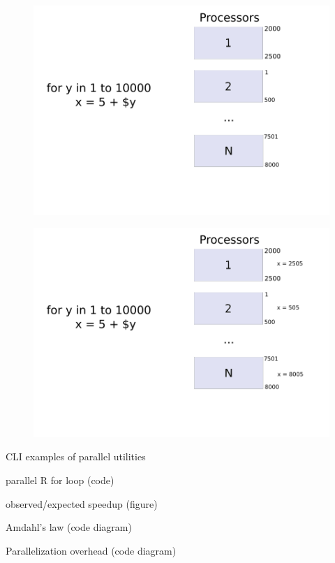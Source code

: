 
\begin{frame}
		\begin{figure}
				\includegraphics[width=0.8\linewidth]{figures/diagrams/forloop/fordiagram}
		\end{figure}	
\end{frame}

\begin{frame}
		\begin{figure}
				\includegraphics[width=0.8\linewidth]{figures/diagrams/forloop/fordiagram2}
		\end{figure}	
\end{frame}

\begin{frame}
		CLI examples of parallel utilities
\end{frame}

\begin{frame}
		parallel R for loop (code)
\end{frame}

\begin{frame}
		observed/expected speedup (figure)
\end{frame}

\begin{frame}
		Amdahl's law (code diagram)
\end{frame}

\begin{frame}
		Parallelization overhead (code diagram)
\end{frame}

